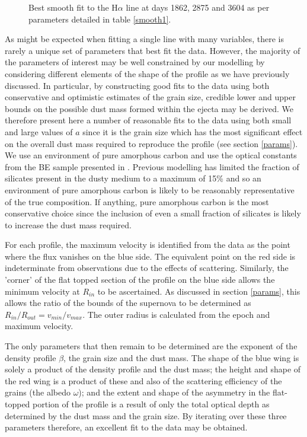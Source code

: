 \documentclass[useAMS,usenatbib,usegraphicx]{mnras}
\begin{document}
\begin{figure}
\begin{center}
\caption{Best smooth fit to the H$\alpha$ line at days 1862, 2875 and 
3604 as per parameters detailed in table \ref{smooth1}.}
\label{d1862_3604}
\end{center}
\end{figure}


As might be expected when fitting a single line with many variables, there 
is rarely a unique set of parameters that best fit the data.  However, the 
majority of the parameters of interest may be well constrained by our 
modelling by considering different elements of the shape of the profile as 
we have previously discussed.  In particular, by constructing good fits to 
the data using both conservative and optimistic estimates of the grain 
size, credible lower and upper bounds on the possible dust mass formed 
within the ejecta may be derived.  We therefore present here a number of 
reasonable fits to the data using both small and large values of $a$ since 
it is the grain size which has the most significant effect on the overall 
dust mass required to reproduce the profile (see section \ref{params}).  
We use an environment of pure amorphous carbon and use the optical 
constants from the BE sample presented in \citet{Zubko1996}.  Previous 
modelling has limited the fraction of silicates present in the dusty 
medium to a maximum of 15\% \citep{Wesson2015,Ercolano2007} and so an 
environment of pure amorphous carbon is likely to be reasonably 
representative of the true composition.  If anything, pure amorphous 
carbon is the most conservative choice since the inclusion of even a small 
fraction of silicates is likely to increase the dust mass required.

For each profile, the maximum velocity is identified from the data as the 
point where the flux vanishes on the blue side.  The equivalent point on 
the red side is indeterminate from observations due to the effects of 
scattering.  Similarly, the 'corner' of the flat topped section of the 
profile on the blue side allows the minimum velocity at $R_{in}$ to be 
ascertained. As discussed in section \ref{params}, this allows the ratio 
of the bounds of the supernova to be determined as 
$R_{in}/R_{out}=v_{min}/v_{max}$.  The outer radius is calculated from the 
epoch and maximum velocity.

The only parameters that then remain to be determined are the exponent of 
the density profile $\beta$, the grain size and the dust mass.  The shape 
of the blue wing is solely a product of the density profile and the dust 
mass; the height and shape of the red wing is a product of these and also 
of the scattering efficiency of the grains (the albedo $\omega$); and the 
extent and shape of the asymmetry in the flat-topped portion of the 
profile is a result of only the total optical depth as determined by the 
dust mass and the grain size.  By iterating over these three parameters 
therefore, an excellent fit to the data may be obtained.
\end{document}
